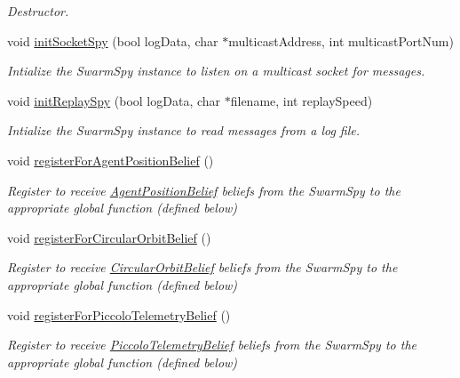 \begin{DoxyCompactItemize}
\begin{DoxyCompactList}\small\item\em Destructor. \end{DoxyCompactList}\item 
void \hyperlink{class_swarm_spy_handler_a1fe5a42aaa0d7bd524383eca6daa59ad}{initSocketSpy} (bool logData, char $\ast$multicastAddress, int multicastPortNum)
\begin{DoxyCompactList}\small\item\em Intialize the SwarmSpy instance to listen on a multicast socket for messages. \end{DoxyCompactList}\item 
void \hyperlink{class_swarm_spy_handler_ab7b8b960ff7b67964bde1a58da002c55}{initReplaySpy} (bool logData, char $\ast$filename, int replaySpeed)
\begin{DoxyCompactList}\small\item\em Intialize the SwarmSpy instance to read messages from a log file. \end{DoxyCompactList}\item 
void \hyperlink{class_swarm_spy_handler_a01ac184506912d0dbc8832e7b7ea575f}{registerForAgentPositionBelief} ()
\begin{DoxyCompactList}\small\item\em Register to receive \hyperlink{class_agent_position_belief}{AgentPositionBelief} beliefs from the SwarmSpy to the appropriate global function (defined below) \end{DoxyCompactList}\item 
void \hyperlink{class_swarm_spy_handler_a1807278c692ee145e1b4d9bd7523981d}{registerForCircularOrbitBelief} ()
\begin{DoxyCompactList}\small\item\em Register to receive \hyperlink{class_circular_orbit_belief}{CircularOrbitBelief} beliefs from the SwarmSpy to the appropriate global function (defined below) \end{DoxyCompactList}\item 
void \hyperlink{class_swarm_spy_handler_a0c4c8e7b62a601fd8958ab8deebaf44f}{registerForPiccoloTelemetryBelief} ()
\begin{DoxyCompactList}\small\item\em Register to receive \hyperlink{class_piccolo_telemetry_belief}{PiccoloTelemetryBelief} beliefs from the SwarmSpy to the appropriate global function (defined below) \end{DoxyCompactList}\item 

\end{DoxyCompactItemize}
